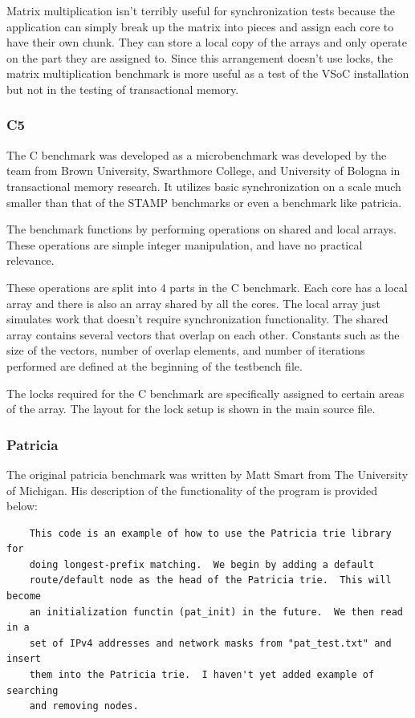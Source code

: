 \documentclass{article}
\begin{document}
Matrix multiplication isn't terribly useful for synchronization tests because 
the application can simply break up the matrix into pieces and assign each 
core to have their own chunk.  They can store a local copy of the arrays and 
only operate on the part they are assigned to. Since this arrangement doesn't 
use locks, the matrix multiplication benchmark is more useful as a test of the 
VSoC installation but not in the testing of transactional memory. 

\subsubsection{C5}

The C benchmark was developed as a microbenchmark was developed by the team
from Brown University, Swarthmore College, and University of Bologna in 
transactional memory research. It utilizes basic synchronization on a scale 
much smaller than that of the STAMP benchmarks or even a benchmark like 
patricia.

The benchmark functions by performing operations on shared and local arrays. 
These operations are simple integer manipulation, and have no practical 
relevance. 

These operations are split into 4 parts in the C benchmark. Each core has a 
local array and there is also an array shared by all the cores. The local 
array just simulates work that doesn't require synchronization functionality. 
The shared array contains several vectors that overlap on each other. 
Constants such as the size of the vectors, number of overlap elements, and 
number of iterations performed are defined at the beginning of the testbench
 file. 

The locks required for the C benchmark are specifically assigned to certain 
areas of the array. The layout for the lock setup is shown in the main source 
file.

\subsubsection{Patricia}

The original patricia benchmark was written by Matt Smart from The University of
 Michigan. His description of the functionality of the program is provided
below:

\begin{verbatim}
    This code is an example of how to use the Patricia trie library for
    doing longest-prefix matching.  We begin by adding a default
    route/default node as the head of the Patricia trie.  This will become
    an initialization functin (pat_init) in the future.  We then read in a
    set of IPv4 addresses and network masks from "pat_test.txt" and insert
    them into the Patricia trie.  I haven't yet added example of searching
    and removing nodes.
\end{verbatim}
\end{document}
